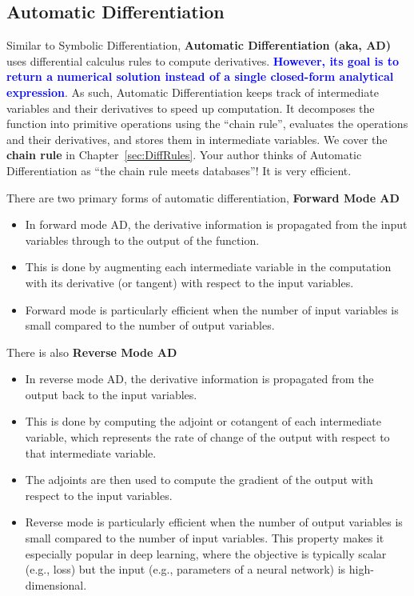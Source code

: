 \subsection{Automatic Differentiation}
\label{sec:AutomaticDifferentiation}

Similar to Symbolic Differentiation, \textbf{Automatic Differentiation (aka, AD)} uses differential calculus rules to compute derivatives. \textcolor{blue}{\bf However, its goal is to return a numerical solution instead of a single closed-form analytical expression}. As such, Automatic Differentiation keeps track of intermediate variables and their derivatives to speed up computation. It decomposes the function into primitive operations using the ``chain rule'', evaluates the operations and their derivatives, and stores them in intermediate variables. We cover the \textbf{chain rule} in Chapter~\ref{sec:DiffRules}. Your author thinks of Automatic Differentiation as ``the chain rule meets databases''! It is very efficient. 

There are two primary forms of automatic differentiation, \textbf{Forward Mode AD}
\begin{itemize}
    \item In forward mode AD, the derivative information is propagated from the input variables through to the output of the function.
    \item This is done by augmenting each intermediate variable in the computation with its derivative (or tangent) with respect to the input variables.
    \item Forward mode is particularly efficient when the number of input variables is small compared to the number of output variables.
\end{itemize}

There is also \textbf{Reverse Mode AD}
\begin{itemize}
    \item In reverse mode AD, the derivative information is propagated from the output back to the input variables.
    \item This is done by computing the adjoint or cotangent of each intermediate variable, which represents the rate of change of the output with respect to that intermediate variable.
    \item The adjoints are then used to compute the gradient of the output with respect to the input variables.
    \item Reverse mode is particularly efficient when the number of output variables is small compared to the number of input variables. This property makes it especially popular in deep learning, where the objective is typically scalar (e.g., loss) but the input (e.g., parameters of a neural network) is high-dimensional.
\end{itemize}

